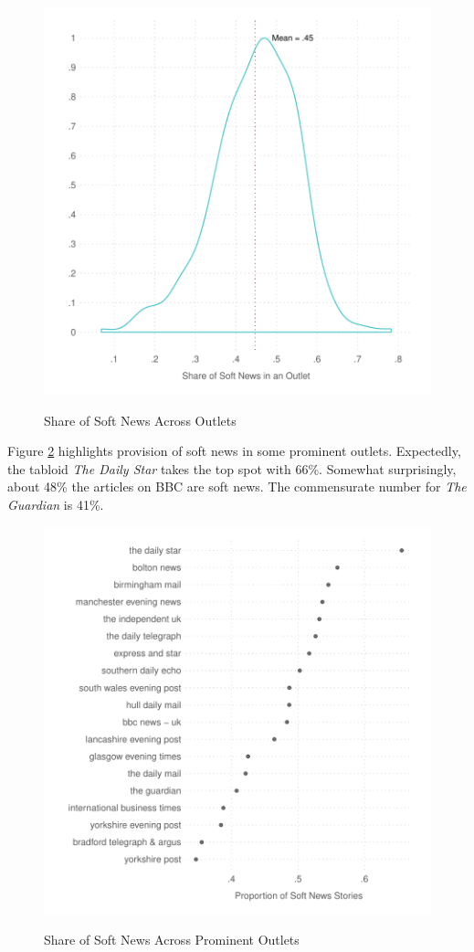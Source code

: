 \documentclass[12pt, letterpaper]{article}
\begin{document}
\begin{figure}[!htbp]
\centering
\caption{Share of Soft News Across Outlets}
\includegraphics[scale=.9]{../figs/uk_not_news_by_outlet.pdf}
\label{fig:agg_density}
\end{figure}

Figure \ref{fig:uk_dot_plot} highlights provision of soft news in some prominent outlets. Expectedly, the tabloid \textit{The Daily Star} takes the top spot with 66\%. Somewhat surprisingly, about 48\% the articles on BBC are soft news. The commensurate number for \textit{The Guardian} is 41\%. 

\begin{figure}[!htbp]
\centering
\caption{Share of Soft News Across Prominent Outlets}
\includegraphics[scale = .9]{../figs/uk_not_news_by_outlet_main_dotplot.pdf}
\label{fig:uk_dot_plot}
\end{figure}
\end{document}

